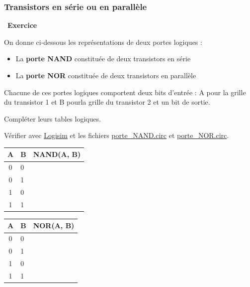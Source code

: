 \documentclass[
  11pt,
]{article}
\providecommand{\tightlist}{%
  \setlength{\itemsep}{0pt}\setlength{\parskip}{0pt}}
\newcounter{exo}
\newenvironment{exercice}[1]
{\par \medskip   \addtocounter{exo}{1} \noindent  
\begin{bclogo}[arrondi =0.1,   noborder = true, logo=\bccrayon, marge=4]{~\textbf{Exercice} \textbf{\theexo} {\itshape #1} }  \par}
{
\end{bclogo}
 \par \bigskip }
\newcounter{logi}
\begin{document}
\hypertarget{transistors-en-suxe9rie-ou-en-paralluxe8le}{%
\subsubsection{Transistors en série ou en
parallèle}\label{transistors-en-suxe9rie-ou-en-paralluxe8le}}

\begin{exercice}{}

On donne ci-dessous les représentations de deux portes logiques :

\begin{itemize}
\tightlist
\item
  La \textbf{porte NAND} constituée de deux transistors en série
\item
  La \textbf{porte NOR} constituée de deux transistors en parallèle
\end{itemize}

Chacune de ces portes logiques comportent deux bits d'entrée : A pour la
grille du transistor 1 et B pourla grille du transistor 2 et un bit de
sortie.

Compléter leurs tables logiques.

Vérifier avec \href{http://www.cburch.com/logisim/}{Logisim} et les
fichiers \href{circuits_logisim/porte_NAND.circ}{porte\_NAND.circ} et
\href{circuits_logisim/porte_NOR.circ}{porte\_NOR.circ}.

\begin{longtable}[]{@{}cll@{}}
\toprule
A & B & NAND(A, B)\tabularnewline
\midrule
\endhead
0 & 0 &\tabularnewline
0 & 1 &\tabularnewline
1 & 0 &\tabularnewline
1 & 1 &\tabularnewline
\bottomrule
\end{longtable}

\begin{longtable}[]{@{}cll@{}}
\toprule
A & B & NOR(A, B)\tabularnewline
\midrule
\endhead
0 & 0 &\tabularnewline
0 & 1 &\tabularnewline
1 & 0 &\tabularnewline
1 & 1 &\tabularnewline
\bottomrule
\end{longtable}

\end{exercice}
\end{document}
